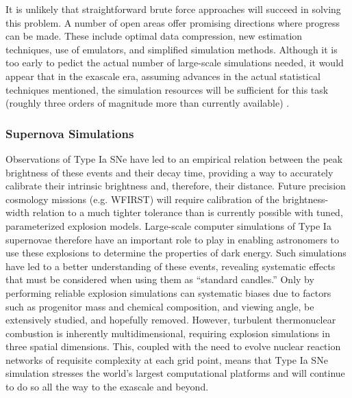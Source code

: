 It is unlikely that straightforward brute force approaches will
succeed in solving this problem. A number of open areas offer
promising directions where progress can be made. These include optimal
data compression, new estimation techniques, use of emulators, and
simplified simulation methods. Although it is too early to pedict the
actual number of large-scale simulations needed, it would appear that
in the exascale era, assuming advances in the actual statistical
techniques mentioned, the simulation resources will be sufficient for
this task (roughly three orders of magnitude more than currently
available) .

\subsubsection{Supernova Simulations}

Observations of Type Ia SNe have led to an empirical relation between
the peak brightness of these events and their decay time, providing a
way to accurately calibrate their intrinsic brightness and, therefore,
their distance. Future precision cosmology missions (e.g. WFIRST) will
require calibration of the brightness-width relation to a much tighter
tolerance than is currently possible with tuned, parameterized
explosion models. Large-scale computer simulations of Type Ia
supernovae therefore have an important role to play in enabling
astronomers to use these explosions to determine the properties of
dark energy.  Such simulations have led to a better understanding of
these events, revealing systematic effects that must be considered
when using them as ``standard candles.'' Only by performing reliable
explosion simulations can systematic biases due to factors such as
progenitor mass and chemical composition, and viewing angle, be
extensively studied, and hopefully removed. However, turbulent
thermonuclear combustion is inherently multidimensional, requiring
explosion simulations in three spatial dimensions. This, coupled with
the need to evolve nuclear reaction networks of requisite complexity
at each grid point, means that Type Ia SNe simulation stresses the
world's largest computational platforms and will continue to do so all
the way to the exascale and beyond.

